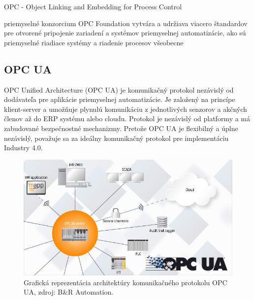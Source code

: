 \documentclass[]{tukediphc}
\begin{document}
OPC - Object Linking and Embedding for Process Control

priemyselné konzorcium OPC Foundation vytvára a udržiava viacero štandardov pre otvorené pripojenie zariadení a systémov priemyselnej automatizácie, ako sú priemyselné riadiace systémy a riadenie procesov všeobecne

\subsection{OPC UA}
 

OPC Unified Architecture (OPC UA) je komunikačný protokol nezávislý od dodávateľa pre aplikácie priemyselnej automatizácie. Je založený na princípe klient-server a umožňuje plynulú komunikáciu z jednotlivých senzorov a akčných členov až do ERP systému alebo cloudu. Protokol je nezávislý od platformy a má zabudované bezpečnostné mechanizmy. Pretože OPC UA je flexibilný a úplne nezávislý, považuje sa za ideálny komunikačný protokol pre implementáciu Industry 4.0.

\begin{figure}[h!]
	\centering
	\includegraphics[width=.9\textwidth,angle=0]{figures/opc-ua.jpg}
	\caption{Grafická reprezentácia architektúry komunikačného protokolu OPC UA, zdroj: B\&R Automation.}
\end{figure}

\end{document}

